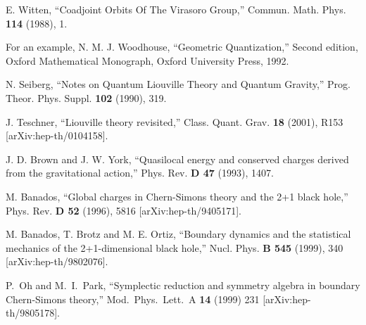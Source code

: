 \documentclass[a4paper,11pt]{article}
\begin{document}
\begin{thebibliography}{99}
E. Witten,
``Coadjoint Orbits Of The Virasoro Group,''
Commun. Math. Phys. {\bf 114} (1988), 1.

For an example, N. M. J. Woodhouse, 
``Geometric Quantization,''
Second edition, Oxford Mathematical Monograph, Oxford University Press,
	1992. 

N. Seiberg,
``Notes on Quantum Liouville Theory and Quantum Gravity,''
Prog. Theor. Phys. Suppl. {\bf 102} (1990), 319.

J. Teschner,
``Liouville theory revisited,''
Class. Quant. Grav. {\bf 18} (2001), R153 [arXiv:hep-th/0104158].

J. D. Brown and J. W. York,
``Quasilocal energy and conserved charges derived from the
gravitational action,''
Phys. Rev. {\bf D 47} (1993), 1407.

M. Banados,
``Global charges in Chern-Simons theory and the 2+1 black hole,''
Phys. Rev. {\bf D 52} (1996), 5816 [arXiv:hep-th/9405171].

M. Banados, T. Brotz and M. E. Ortiz,
``Boundary dynamics and the statistical mechanics of the
2+1-dimensional black hole,''
Nucl. Phys. {\bf B 545} (1999), 340 [arXiv:hep-th/9802076].

P.~Oh and M.~I.~Park,
``Symplectic reduction and symmetry algebra in boundary Chern-Simons
	theory,'' Mod.\ Phys.\ Lett.\ A {\bf 14} (1999) 231
[arXiv:hep-th/9805178].



\end{thebibliography}
\end{document}

